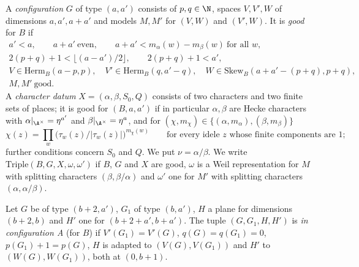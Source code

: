 \begin{definition}\label{pf:thmK-cone:def-config}
A \emph{configuration} $G$ of type $(a,a')$ consists of $p,q\in\N$, spaces $V,V',W$ of dimensions $a,a',a+a'$ and models
$M,M'$ for $(V,W)$ and $(V',W)$.  It is \emph{good} for $B$ if
\begin{equation}\label{pf:thmK-cone:eq-geo}
\begin{gathered}
  a'<a,\qquad a+a'\ \text{even},\qquad a+a'<m_\alpha(w)-m_\beta(w)\ \text{for all }w,\\
  2(p+q)+1<\lfloor(a-a')/2\rfloor,\qquad 2(p+q)+1<a',\\
  V\in\mathrm{Herm}_B(a-p,p),\quad V'\in\mathrm{Herm}_B(q,a'-q),\quad W\in\mathrm{Skew}_B(a+a'-(p+q),p+q),\\
  M,M'\ \text{good}.
\end{gathered}
\end{equation}
A \emph{character datum} $X=(\alpha,\beta,S_0,Q)$ consists of two characters and two finite sets of places; it is good for
$(B,a,a')$ if in particular $\alpha,\beta$ are Hecke characters with $\alpha|_{\A^\times}=\eta^{a'}$ and
$\beta|_{\A^\times}=\eta^a$, and for $(\chi,m_\chi)\in\{(\alpha,m_\alpha),(\beta,m_\beta)\}$
\begin{equation}\label{pf:thmK-cone:eq-hasexp}
  \chi(z)=\prod_w\bigl(\tau_w(z)/|\tau_w(z)|\bigr)^{m_\chi(w)}\qquad\text{for every idele $z$ whose finite components are }1;
\end{equation}
further conditions concern $S_0$ and $Q$.  We put $\nu=\alpha/\beta$.  We write $\mathrm{Triple}(B,G,X,\omega,\omega')$ if
$B$, $G$ and $X$ are good, $\omega$ is a Weil representation for $M$ with splitting characters $(\beta,\beta/\alpha)$ and
$\omega'$ one for $M'$ with splitting characters $(\alpha,\alpha/\beta)$.

Let $G$ be of type $(b+2,a')$, $G_1$ of type $(b,a')$, $H$ a plane for dimensions $(b+2,b)$ and $H'$ one for
$(b+2+a',b+a')$.  The tuple $(G,G_1,H,H')$ is \emph{in configuration A} (for $B$) if $V'(G_1)=V'(G)$,
$q(G)=q(G_1)=0$, $p(G_1)+1=p(G)$, $H$ is adapted to $(V(G),V(G_1))$ and $H'$ to $(W(G),W(G_1))$, both at $(0,b+1)$.
\end{definition}

